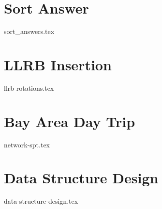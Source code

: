 \documentclass[11pt]{exam}
\begin{document}
\newpage
\section{Sort Answer}
\begin{questions}
{sort_answers.tex}
\end{questions}

\newpage
\section{LLRB Insertion}
\begin{questions}
{llrb-rotations.tex}
\end{questions}

\newpage
\section{Bay Area Day Trip}
\begin{questions}
{network-spt.tex}
\end{questions}

\newpage
\section{Data Structure Design}
\begin{questions}
{data-structure-design.tex}
\end{questions}
\end{document}
